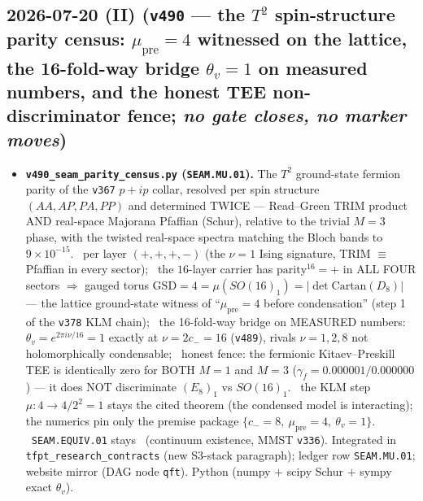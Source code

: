 \subsection*{2026-07-20 (II) (\texttt{v490} --- the $T^2$ spin-structure parity census: $\mu_{\mathrm{pre}}{=}4$ witnessed on the lattice, the 16-fold-way bridge $\theta_v{=}1$ on measured numbers, and the honest TEE non-discriminator fence; \emph{no gate closes, no marker moves})}
\begin{itemize}[leftmargin=1.5em]
\item \textbf{\texttt{v490\_seam\_parity\_census.py} (\texttt{SEAM.MU.01}).} The $T^2$ ground-state fermion
parity of the \texttt{v367} $p{+}ip$ collar, resolved per spin structure $(AA,AP,PA,PP)$ and determined
TWICE --- Read--Green TRIM product AND real-space Majorana Pfaffian (Schur), relative to the trivial
$M{=}3$ phase, with the twisted real-space spectra matching the Bloch bands to $9\times10^{-15}$. \mE\
per layer $(+,+,+,-)$ (the $\nu{=}1$ Ising signature, TRIM $\equiv$ Pfaffian in every sector); \mE\ the
$16$-layer carrier has $\mathrm{parity}^{16}={+}$ in ALL FOUR sectors $\Rightarrow$ gauged torus
$\mathrm{GSD}=4=\mu(SO(16)_1)=|\det\mathrm{Cartan}(D_8)|$ --- the lattice ground-state witness of
``$\mu_{\mathrm{pre}}{=}4$ before condensation'' (step 1 of the \texttt{v378} KLM chain); \mE\ the
16-fold-way bridge on MEASURED numbers: $\theta_v=e^{2\pi i\nu/16}=1$ exactly at $\nu=2c_-=16$
(\texttt{v489}), rivals $\nu=1,2,8$ not holomorphically condensable; \mE\ honest fence: the fermionic
Kitaev--Preskill TEE is identically zero for BOTH $M{=}1$ and $M{=}3$ ($\gamma_f{=}0.000001/0.000000$) ---
it does NOT discriminate $(E_8)_1$ vs $SO(16)_1$. \mC\ the KLM step $\mu:4\to4/2^2=1$ stays the cited
theorem (the condensed model is interacting); the numerics pin only the premise package
$\{c_-{=}8,\ \mu_{\mathrm{pre}}{=}4,\ \theta_v{=}1\}$. \mO\ \texttt{SEAM.EQUIV.01} stays \mO\ (continuum
existence, MMST \texttt{v336}). Integrated in \texttt{tfpt\_research\_contracts} (new S3-stack paragraph);
ledger row \texttt{SEAM.MU.01}; website mirror (DAG node \texttt{qft}). Python (numpy $+$ scipy Schur $+$
sympy exact $\theta_v$).
\end{itemize}

